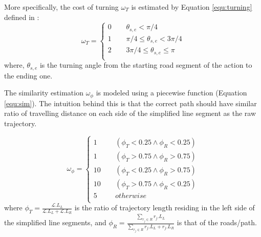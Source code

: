 More specifically, the cost of turning $\omega_{T}$ is estimated by Equation \ref{equ:turning} defined in \cite{Osogami:2013:IRL}:
\begin{equation}
  \omega_{T} = \left\{
    \begin{aligned}
      0 & \ \ & \theta_{s,e} < \pi / 4 \\
      1 & \ \ & \pi / 4 \le \theta_{s,e} < 3\pi /4 \\
      2 & \ \ & 3\pi / 4 \le \theta_{s,e} \le \pi  \\
    \end{aligned}
  \right.
  \label{equ:turning}
\end{equation}
where, $\theta_{s,e}$ is the turning angle from the starting road segment of the action to the ending one.


The similarity estimation $\omega_{\phi}$ is modeled using a
piecewise function (Equation \ref{equ:sim}). The intuition behind this is that the correct path should have similar ratio of travelling distance on each side of the simplified line segment as the raw trajectory.

\begin{equation}
  \omega_{\phi} = \left\{
    \begin{aligned}
      1 & \ \ & (\phi_T < 0.25 \wedge \phi_{R} < 0.25) \\
      1 & \ \ & (\phi_T > 0.75 \wedge \phi_{R} > 0.75) \\
      10 & \ \ & (\phi_T < 0.25 \wedge \phi_{R} > 0.75) \\
      10 & \ \ & (\phi_T > 0.75 \wedge \phi_{R} < 0.25) \\
      5 & \ \ & otherwise \\
    \end{aligned}
  \right.
  \label{equ:sim}
\end{equation}
where $\phi_T= \frac{\mathcal{L}.L_L}{\mathcal{L}.L_L + \mathcal{L}.L_R}$ is the ratio of trajectory length residing in the left side of the
simplified line segments, and $\phi_R= \frac{\sum_{r_j \in R}r_j.L_L}{\sum_{r_j \in R}r_j.L_L + r_j.L_R}$ is that of the {roads/path}.


